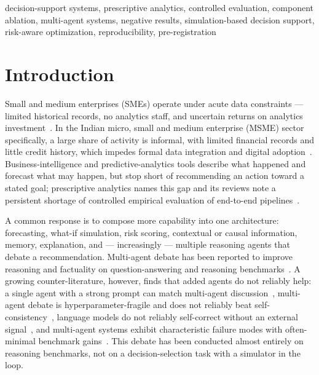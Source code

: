 \documentclass[conference]{IEEEtran}
\begin{document}
\begin{IEEEkeywords}
decision-support systems, prescriptive analytics, controlled evaluation,
component ablation, multi-agent systems, negative results, simulation-based
decision support, risk-aware optimization, reproducibility, pre-registration
\end{IEEEkeywords}

\section{Introduction}
\label{sec:intro}

Small and medium enterprises (SMEs) operate under acute data constraints ---
limited historical records, no analytics staff, and uncertain returns on
analytics investment~\cite{OECD2021}. In the Indian micro, small and medium
enterprise (MSME) sector specifically, a large share of activity is informal,
with limited financial records and little credit history, which impedes formal
data integration and digital adoption~\cite{Buteau2021}. Business-intelligence
and predictive-analytics tools describe what happened and forecast what may
happen, but stop short of recommending an action toward a stated goal;
prescriptive analytics names this gap and its reviews note a persistent shortage
of controlled empirical evaluation of end-to-end
pipelines~\cite{Lepenioti2020,Arnott2014,Shmueli2011}.

A common response is to compose more capability into one architecture:
forecasting, what-if simulation, risk scoring, contextual or causal
information, memory, explanation, and --- increasingly --- multiple reasoning
agents that debate a recommendation. Multi-agent debate has been reported to
improve reasoning and factuality on question-answering and reasoning
benchmarks~\cite{Du2023,Liang2024,Li2024}. A growing counter-literature,
however, finds that added agents do not reliably help: a single agent with a
strong prompt can match multi-agent discussion~\cite{Wang2024}, multi-agent
debate is hyperparameter-fragile and does not reliably beat
self-consistency~\cite{Smit2024}, language models do not reliably self-correct
without an external signal~\cite{Huang2024}, and multi-agent systems exhibit
characteristic failure modes with often-minimal benchmark
gains~\cite{Cemri2025}. This debate has been conducted almost entirely on
reasoning benchmarks, not on a decision-selection task with a simulator in the
loop.
\end{document}
